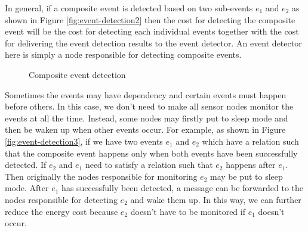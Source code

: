 In general, if a composite event is detected based on two sub-events \(e_1\) and \(e_2\) as shown in Figure \ref{fig:event-detection2} then the cost for detecting the composite event will be the cost for detecting each individual events together with the cost for delivering the event detection results to the event detector. An event detector here is simply a node responsible for detecting composite events.

\begin{figure}
\centering
{}
\qquad
{}
\caption{Composite event detection}
\label{fig:event-detection}
\end{figure}

Sometimes the events may have dependency and certain events must happen before others. In this case, we don't need to make all sensor nodes monitor the events at all the time. Instead, some nodes may firstly put to sleep mode and then be waken up when other events occur. For example, as shown in Figure \ref{fig:event-detection3}, if we have two events \(e_1\) and \(e_2\) which have a relation such that the composite event happens only when both events have been successfully detected. If \(e_2\) and \(e_1\) need to satisfy a relation such that \(e_2\) happens after \(e_1\). Then originally the nodes responsible for monitoring \(e_2\) may be put to sleep mode. After \(e_1\) has successfully been detected, a message can be forwarded to the nodes responsible for detecting \(e_2\) and wake them up. In this way, we can further reduce the energy cost because \(e_2\) doesn't have to be monitored if \(e_1\) doesn't occur.
